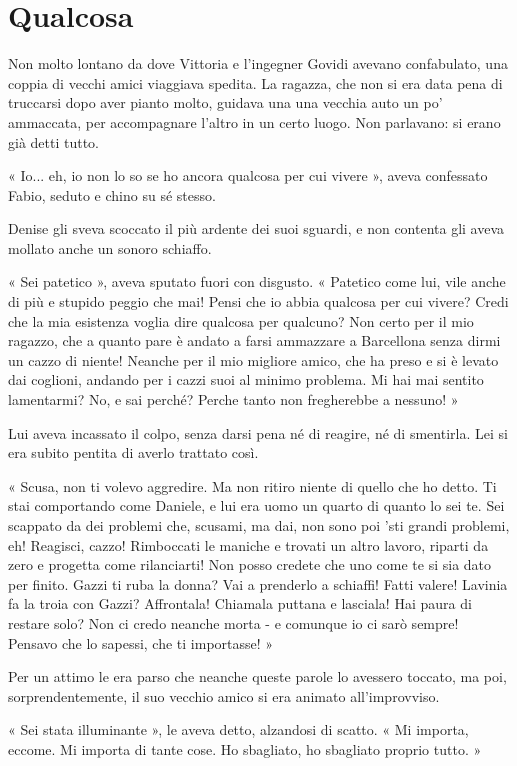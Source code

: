 \chapter{Qualcosa}

Non molto lontano da dove Vittoria e l'ingegner Govidi avevano confabulato, una coppia di vecchi amici viaggiava spedita. La ragazza, che non si era data pena di truccarsi dopo aver pianto molto, guidava una una vecchia auto un po' ammaccata, per accompagnare l'altro in un certo luogo. Non parlavano: si erano già detti tutto.

« Io... eh, io non lo so se ho ancora qualcosa per cui vivere », aveva confessato Fabio, seduto e chino su sé stesso.

Denise gli sveva scoccato il più ardente dei suoi sguardi, e non contenta gli aveva mollato anche un sonoro schiaffo.

« Sei patetico », aveva sputato fuori con disgusto. « Patetico come lui, vile anche di più e stupido peggio che mai! Pensi che io abbia qualcosa per cui vivere? Credi che la mia esistenza voglia dire qualcosa per qualcuno? Non certo per il mio ragazzo, che a quanto pare è andato a farsi ammazzare a Barcellona senza dirmi un cazzo di niente! Neanche per il mio migliore amico, che ha preso e si è levato dai coglioni, andando per i cazzi suoi al minimo problema. Mi hai mai sentito lamentarmi? No, e sai perché? Perche tanto non fregherebbe a nessuno! »

Lui aveva incassato il colpo, senza darsi pena né di reagire, né di smentirla. Lei si era subito pentita di averlo trattato così.

« Scusa, non ti volevo aggredire. Ma non ritiro niente di quello che ho detto. Ti stai comportando come Daniele, e lui era uomo un quarto di quanto lo sei te. Sei scappato da dei problemi che, scusami, ma dai, non sono poi 'sti grandi problemi, eh! Reagisci, cazzo! Rimboccati le maniche e trovati un altro lavoro, riparti da zero e progetta come rilanciarti! Non posso credete che uno come te si sia dato per finito. Gazzi ti ruba la donna? Vai a prenderlo a schiaffi! Fatti valere! Lavinia fa la troia con Gazzi? Affrontala! Chiamala puttana e lasciala! Hai paura di restare solo? Non ci credo neanche morta - e comunque io ci sarò sempre! Pensavo che lo sapessi, che ti importasse! »

Per un attimo le era parso che neanche queste parole lo avessero toccato, ma poi, sorprendentemente, il suo vecchio amico si era animato all'improvviso.

« Sei stata illuminante », le aveva detto, alzandosi di scatto. « Mi importa, eccome. Mi importa di tante cose. Ho sbagliato, ho sbagliato proprio tutto. »

